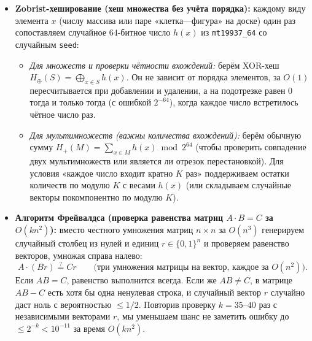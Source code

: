 \documentclass[10pt,a4paper]{article}
\renewcommand{\le}{\leqslant}
\begin{document}
\begin{itemize}
  \item \textbf{Zobrist-хеширование (хеш множества без учёта порядка):} каждому виду элемента $x$ (числу массива или паре «клетка—фигура» на доске) один раз сопоставляем случайное $64$-битное число $h(x)$ из \texttt{mt19937\_64} со случайным \texttt{seed}:
  \begin{itemize}
    \item \emph{Для множеств и проверки чётности вхождений:} берём XOR-хеш $H_\oplus(S) = \bigoplus_{x \in S} h(x)$. Он не зависит от порядка элементов, за $O(1)$ пересчитывается при добавлении и удалении, а на подотрезке равен $0$ тогда и только тогда (с ошибкой $2^{-64}$), когда каждое число встретилось чётное число раз.
    \item \emph{Для мультимножеств (важны количества вхождений):} берём обычную сумму $H_+(M) = \sum_{x \in M} h(x) \bmod 2^{64}$ (чтобы проверить совпадение двух мультимножеств или является ли отрезок перестановкой). Для условия «каждое число входит кратно $K$ раз» поддерживаем остатки количеств по модулю $K$ с весами $h(x)$ (или складываем случайные векторы покомпонентно по модулю $K$).
  \end{itemize}

  \item \textbf{Алгоритм Фрейвалдса (проверка равенства матриц $A \cdot B = C$ за $O(k n^2)$):} вместо честного умножения матриц $n \times n$ за $O(n^3)$ генерируем случайный столбец из нулей и единиц $r \in \{0, 1\}^n$ и проверяем равенство векторов, умножая справа налево:
  \[
    A \cdot (B r) \stackrel{?}{=} C r \qquad \bigl(\text{три умножения матрицы на вектор, каждое за } O(n^2)\bigr).
  \]
  Если $AB = C$, равенство выполнится всегда. Если же $AB \ne C$, в матрице $AB - C$ есть хотя бы одна ненулевая строка, и случайный вектор $r$ случайно даст ноль с вероятностью $\le 1/2$. Повторив проверку $k = 35\text{--}40$ раз с независимыми векторами $r$, мы уменьшаем шанс не заметить ошибку до $\le 2^{-k} < 10^{-11}$ за время $O(k n^2)$.
\end{itemize}
\end{document}
